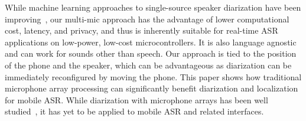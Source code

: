 While machine learning approaches to single-source speaker diarization have been improving~\cite{park2022review}, our multi-mic approach has the advantage of lower computational cost, latency, and privacy, and thus is inherently suitable for real-time ASR applications on low-power, low-cost microcontrollers. It is also language agnostic and can work for sounds other than speech. Our approach is tied to the position of the phone and the speaker, which can be advantageous as diarization can be immediately reconfigured by moving the phone. This paper shows how traditional microphone array processing can significantly benefit diarization and localization for mobile ASR. While diarization with microphone arrays has been well studied~\cite{anguera2007acoustic}, it has yet to be applied to mobile ASR and related interfaces.


